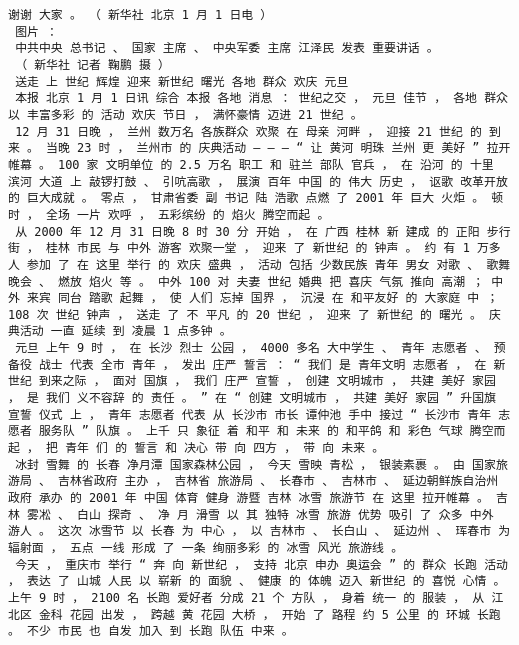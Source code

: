 \documentclass{article}
\begin{document}
\begin{Verbatim}[commandchars=\\\{\}]
 谢谢 大家 。 （ 新华社 北京 1 月 1 日电 ） 
 图片 ： 
 中共中央 总书记 、 国家 主席 、 中央军委 主席 江泽民 发表 重要讲话 。 
 （ 新华社 记者 鞠鹏 摄 ） 
 送走 上 世纪 辉煌 迎来 新世纪 曙光 各地 群众 欢庆 元旦 
 本报 北京 1 月 1 日讯 综合 本报 各地 消息 ： 世纪之交 ， 元旦 佳节 ， 各地 群众 以 丰富多彩 的 活动 欢庆 节日 ， 满怀豪情 迈进 21 世纪 。 
 12 月 31 日晚 ， 兰州 数万名 各族群众 欢聚 在 母亲 河畔 ， 迎接 21 世纪 的 到来 。 当晚 23 时 ， 兰州市 的 庆典活动 — — — “ 让 黄河 明珠 兰州 更 美好 ” 拉开帷幕 。 100 家 文明单位 的 2.5 万名 职工 和 驻兰 部队 官兵 ， 在 沿河 的 十里 滨河 大道 上 敲锣打鼓 、 引吭高歌 ， 展演 百年 中国 的 伟大 历史 ， 讴歌 改革开放 的 巨大成就 。 零点 ， 甘肃省委 副 书记 陆 浩歌 点燃 了 2001 年 巨大 火炬 。 顿时 ， 全场 一片 欢呼 ， 五彩缤纷 的 焰火 腾空而起 。 
 从 2000 年 12 月 31 日晚 8 时 30 分 开始 ， 在 广西 桂林 新 建成 的 正阳 步行街 ， 桂林 市民 与 中外 游客 欢聚一堂 ， 迎来 了 新世纪 的 钟声 。 约 有 1 万多 人 参加 了 在 这里 举行 的 欢庆 盛典 ， 活动 包括 少数民族 青年 男女 对歌 、 歌舞晚会 、 燃放 焰火 等 。 中外 100 对 夫妻 世纪 婚典 把 喜庆 气氛 推向 高潮 ； 中外 来宾 同台 踏歌 起舞 ， 使 人们 忘掉 国界 ， 沉浸 在 和平友好 的 大家庭 中 ； 108 次 世纪 钟声 ， 送走 了 不 平凡 的 20 世纪 ， 迎来 了 新世纪 的 曙光 。 庆典活动 一直 延续 到 凌晨 1 点多钟 。 
 元旦 上午 9 时 ， 在 长沙 烈士 公园 ， 4000 多名 大中学生 、 青年 志愿者 、 预备役 战士 代表 全市 青年 ， 发出 庄严 誓言 ： “ 我们 是 青年文明 志愿者 ， 在 新世纪 到来之际 ， 面对 国旗 ， 我们 庄严 宣誓 ， 创建 文明城市 ， 共建 美好 家园 ， 是 我们 义不容辞 的 责任 。 ” 在 “ 创建 文明城市 ， 共建 美好 家园 ” 升国旗 宣誓 仪式 上 ， 青年 志愿者 代表 从 长沙市 市长 谭仲池 手中 接过 “ 长沙市 青年 志愿者 服务队 ” 队旗 。 上千 只 象征 着 和平 和 未来 的 和平鸽 和 彩色 气球 腾空而起 ， 把 青年 们 的 誓言 和 决心 带 向 四方 ， 带 向 未来 。 
 冰封 雪舞 的 长春 净月潭 国家森林公园 ， 今天 雪映 青松 ， 银装素裹 。 由 国家旅游局 、 吉林省政府 主办 ， 吉林省 旅游局 、 长春市 、 吉林市 、 延边朝鲜族自治州 政府 承办 的 2001 年 中国 体育 健身 游暨 吉林 冰雪 旅游节 在 这里 拉开帷幕 。 吉林 雾凇 、 白山 探奇 、 净 月 滑雪 以 其 独特 冰雪 旅游 优势 吸引 了 众多 中外 游人 。 这次 冰雪节 以 长春 为 中心 ， 以 吉林市 、 长白山 、 延边州 、 珲春市 为 辐射面 ， 五点 一线 形成 了 一条 绚丽多彩 的 冰雪 风光 旅游线 。 
 今天 ， 重庆市 举行 “ 奔 向 新世纪 ， 支持 北京 申办 奥运会 ” 的 群众 长跑 活动 ， 表达 了 山城 人民 以 崭新 的 面貌 、 健康 的 体魄 迈入 新世纪 的 喜悦 心情 。 上午 9 时 ， 2100 名 长跑 爱好者 分成 21 个 方队 ， 身着 统一 的 服装 ， 从 江北区 金科 花园 出发 ， 跨越 黄 花园 大桥 ， 开始 了 路程 约 5 公里 的 环城 长跑 。 不少 市民 也 自发 加入 到 长跑 队伍 中来 。 

\end{Verbatim}
\end{document}
